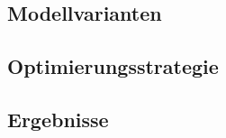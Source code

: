 \subsection{Modellvarianten}

\subsection{Optimierungsstrategie}
\label{sec:opt_strat}


\subsection{Ergebnisse}
% 
% 
% 
% 
% 
% 
% 
% 
% 
% 
% 
% 